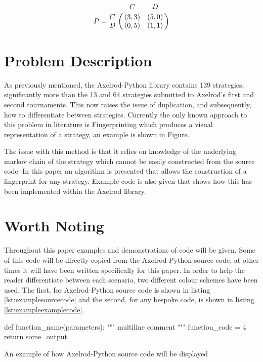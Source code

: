 \begin{equation}\label{eq:payoff_matrix}
%
P = \bordermatrix{~ & C & D \cr
                  C & (3, 3) & (5, 0) \cr
                  D & (0, 5) & (1, 1) \cr}
%
\end{equation}

\section{Problem Description}

As previously mentioned, the Axelrod-Python library contains 139 strategies, significantly more than the 13 and 64 strategies submitted to Axelrod's first and second tournaments.
This now raises the issue of duplication, and subsequently, how to differentiate between strategies.
Currently the only known approach to this problem in literature is Fingerprinting which produces a visual representation of a strategy, an example is shown in Figure. %

The issue with this method is that it relies on knowledge of the underlying markov chain of the strategy which cannot be easily constructed from the source code.
In this paper an algorithm is presented that allows the construction of a fingerprint for any strategy.
Example code is also given that shows how this has been implemented within the Axelrod library.


\section{Worth Noting}

Throughout this paper examples and demonstrations of code will be given.
Some of this code will be directly copied from the Axelrod-Python source code, at other times it will have been written specifically for this paper.
In order to help the reader differentiate between each scenario, two different colour schemes have been used.
The first, for Axelrod-Python source code is shown in listing \ref{lst:examplesourcecode} and the second, for any bespoke code, is shown in listing \ref{lst:exampleexamplecode}.

\begin{listing}[hbtp!]
\begin{SourceCode}
def function_name(parameters):
    """
    multiline comment
    """
    function_code = 4
    return some_output
\end{SourceCode}
\caption{An example of how Axelrod-Python source code will be displayed}
\label{lst:examplesourcecode}
\end{listing}

